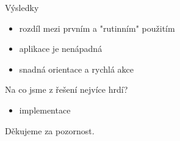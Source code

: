 \documentclass[17pt]{beamer}
\begin{document}
\begin{frame}{Výsledky}
\begin{itemize}
    \item rozdíl mezi prvním a "rutinním" použitím
    \item aplikace je nenápadná
    \item snadná orientace a rychlá akce
\end{itemize}
\end{frame}

\begin{frame}{Na co jsme z řešení nejvíce hrdí?}
\begin{itemize}
    \item implementace
\end{itemize}
\end{frame}

\begin{frame}
\begin{center}
    {\LARGE Děkujeme za pozornost.}
\end{center}
\end{frame}
\end{document}

